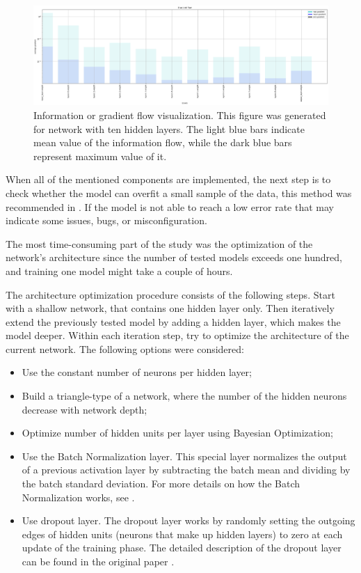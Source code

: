 \begin{figure}[!h]
\centering
\includegraphics[width=\textwidth]{figures/NN/Gradient_flow.png}
\caption{Information or gradient flow visualization. This figure was generated for network with ten hidden layers. The light blue bars indicate mean value of the information flow, while the dark blue bars represent maximum value of it.    
\label{fig:gradient_flow}}
\end{figure}


When all of the mentioned components are implemented, the next step is to check whether the model can overfit a small sample of the data, this method was recommended in \cite{karpathy}. If the model is not able to reach a low error rate that may indicate some issues, bugs, or misconfiguration.

The most time-consuming part of the study was the optimization of the network's architecture since the number of tested models exceeds one hundred, and training one model might take a couple of hours.

The architecture optimization procedure consists of the following steps. Start with a shallow network, that contains one hidden layer only.  Then iteratively extend the previously tested model by adding a hidden layer, which makes the model deeper.  Within each iteration step, try to optimize the architecture of the current network. The following options were considered: 

\begin{itemize}
\item Use the constant number of neurons per hidden layer; 
\item Build a triangle-type of a network, where the number of the hidden neurons decrease with network depth; 
\item Optimize number of hidden units per layer using Bayesian Optimization;
\item Use the Batch Normalization layer. This special layer normalizes the output of a previous activation layer by subtracting the batch mean and dividing by the batch standard deviation. For more details on how the Batch Normalization works, see \cite{batch_norm}. 
\item Use dropout layer. The dropout layer works by randomly setting the outgoing edges of hidden units (neurons that make up hidden layers) to zero at each update of the training phase. The detailed description of the dropout layer can be found in the original paper \cite{dropout}. 
\end{itemize}


